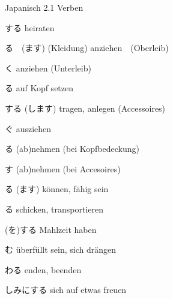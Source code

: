 \begin{multicols*}{2}
\begin{flushleft}
\begin{labeling}{Japanisch 2.1 Verben}
	\item [\ruby{結婚}{けっこん}する] heiraten
	\item [\ruby{着}{き}る　(\ruby{着}{き}ます)] (Kleidung) anziehen　(Oberleib)
	\item [\ruby{履}{は}く] anziehen (Unterleib)
	\item [\ruby{被}{かぶ}る] auf Kopf setzen
	\item [する (します)] tragen, anlegen (Accessoires)
	\item [\ruby{脱}{ぬ}ぐ] ausziehen
	\item [\ruby{取}{と}る] (ab)nehmen (bei Kopfbedeckung)
	\item [\ruby{外}{はず}す] (ab)nehmen (bei Accesoires)
	
	\item [\ruby{出来}{でき}る (\ruby{出来}{でき}ます)] können, fähig sein
	\item [\ruby{送}{おく}る] schicken, transportieren
	
	\item [\ruby{食事}{しょくじ}(を)する] Mahlzeit haben
	
	\item [\ruby{込}{こ}む] überfüllt sein, sich drängen
	\item [\ruby{終}{お}わる] enden, beenden
	\item [\ruby{楽}{たの}しみにする] sich auf etwas freuen
	
\end{labeling}
\end{flushleft}
\end{multicols*}
\clearpage
